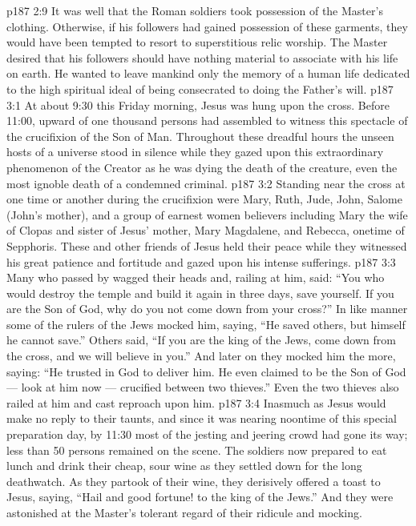 \vs p187 2:9 \pc It was well that the Roman soldiers took possession of the Master’s clothing. Otherwise, if his followers had gained possession of these garments, they would have been tempted to resort to superstitious relic worship. The Master desired that his followers should have nothing material to associate with his life on earth. He wanted to leave mankind only the memory of a human life dedicated to the high spiritual ideal of being consecrated to doing the Father’s will.
\vs p187 3:1 At about 9:30 this Friday morning, Jesus was hung upon the cross. Before 11:00, upward of one thousand persons had assembled to witness this spectacle of the crucifixion of the Son of Man. Throughout these dreadful hours the unseen hosts of a universe stood in silence while they gazed upon this extraordinary phenomenon of the Creator as he was dying the death of the creature, even the most ignoble death of a condemned criminal.
\vs p187 3:2 Standing near the cross at one time or another during the crucifixion were Mary, Ruth, Jude, John, Salome (John’s mother), and a group of earnest women believers including Mary the wife of Clopas and sister of Jesus’ mother, Mary Magdalene, and Rebecca, onetime of Sepphoris. These and other friends of Jesus held their peace while they witnessed his great patience and fortitude and gazed upon his intense sufferings.
\vs p187 3:3 Many who passed by wagged their heads and, railing at him, said: “You who would destroy the temple and build it again in three days, save yourself. If you are the Son of God, why do you not come down from your cross?” In like manner some of the rulers of the Jews mocked him, saying, “He saved others, but himself he cannot save.” Others said, “If you are the king of the Jews, come down from the cross, and we will believe in you.” And later on they mocked him the more, saying: “He trusted in God to deliver him. He even claimed to be the Son of God --- look at him now --- crucified between two thieves.” Even the two thieves also railed at him and cast reproach upon him.
\vs p187 3:4 Inasmuch as Jesus would make no reply to their taunts, and since it was nearing noontime of this special preparation day, by 11:30 most of the jesting and jeering crowd had gone its way; less than 50 persons remained on the scene. The soldiers now prepared to eat lunch and drink their cheap, sour wine as they settled down for the long deathwatch. As they partook of their wine, they derisively offered a toast to Jesus, saying, “Hail and good fortune! to the king of the Jews.” And they were astonished at the Master’s tolerant regard of their ridicule and mocking.
